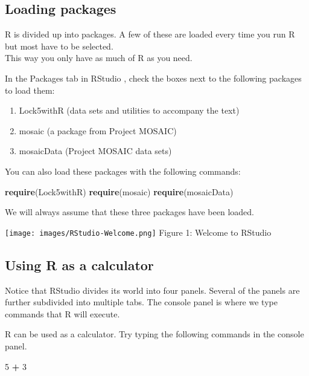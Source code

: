 \documentclass[]{book}
\newenvironment{Shaded}{\begin{snugshade}}{\end{snugshade}}
\newcommand{\DecValTok}[1]{\textcolor[rgb]{0.00,0.00,0.81}{#1}}
\newcommand{\KeywordTok}[1]{\textcolor[rgb]{0.13,0.29,0.53}{\textbf{#1}}}
\newcommand{\NormalTok}[1]{#1}
\newcommand{\OperatorTok}[1]{\textcolor[rgb]{0.81,0.36,0.00}{\textbf{#1}}}
\newcommand{\StringTok}[1]{\textcolor[rgb]{0.31,0.60,0.02}{#1}}
\providecommand{\tightlist}{%
  \setlength{\itemsep}{0pt}\setlength{\parskip}{0pt}}
\begin{document}
\hypertarget{loading-packages}{%
\subsection{Loading packages}\label{loading-packages}}

R is divided up into packages. A few of these are loaded every time you run R but most have to be selected.\\
This way you only have as much of R as you need.

In the {Packages} tab in RStudio ,
check the boxes next to the following packages to load them:

\begin{enumerate}
\tightlist
\item
  Lock5withR (data sets and utilities to accompany the text)
\item
  mosaic (a package from Project MOSAIC)
\item
  mosaicData (Project MOSAIC data sets)
\end{enumerate}

You can also load these packages with the following commands:

\begin{Shaded}
\begin{Highlighting}[]
\KeywordTok{require}\NormalTok{(Lock5withR)}
\KeywordTok{require}\NormalTok{(mosaic)}
\KeywordTok{require}\NormalTok{(mosaicData)}
\end{Highlighting}
\end{Shaded}

We will always assume that these three packages have been loaded.

\texttt{[image: images/RStudio-Welcome.png]}
Figure 1: Welcome to RStudio

\hypertarget{using-r-as-a-calculator}{%
\subsection{Using R as a calculator}\label{using-r-as-a-calculator}}

Notice that RStudio divides its world into four panels. Several of the panels are further subdivided into multiple tabs.
The console panel is where we type commands that R will execute.

R can be used as a calculator. Try typing the following commands in the console panel.

\begin{Shaded}
\begin{Highlighting}[]
\DecValTok{5} \OperatorTok{+}\StringTok{ }\DecValTok{3}
\end{Highlighting}
\end{Shaded}
\end{document}
